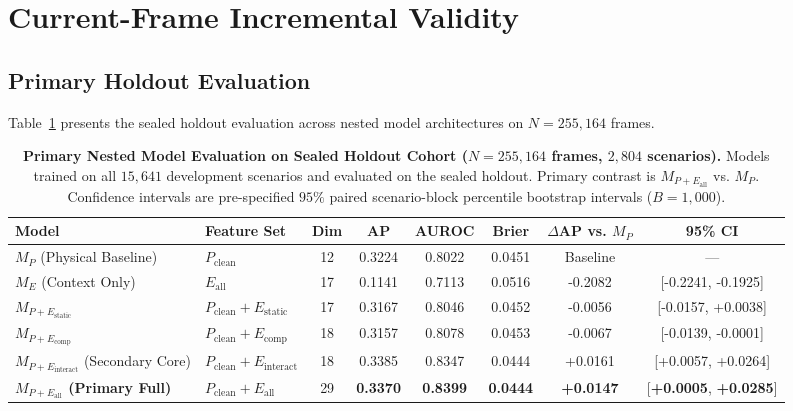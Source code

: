 \section{Current-Frame Incremental Validity}
\label{sec:primary_results}

\subsection{Primary Holdout Evaluation}
Table~\ref{tab:nested_models} presents the sealed holdout evaluation across nested model architectures on $N=255,164$ frames.

\begin{table}[t]
\centering
\footnotesize
\setlength{\tabcolsep}{4pt}
\caption{\textbf{Primary Nested Model Evaluation on Sealed Holdout Cohort ($N=255,164$ frames, $2,804$ scenarios).} Models trained on all $15,641$ development scenarios and evaluated on the sealed holdout. Primary contrast is $M_{P+E_{\text{all}}}$ vs. $M_P$. Confidence intervals are pre-specified $95\%$ paired scenario-block percentile bootstrap intervals ($B=1,000$).}
\label{tab:nested_models}
\begin{tabularx}{\textwidth}{l l c c c c c c}
\toprule
\textbf{Model} & \textbf{Feature Set} & \textbf{Dim} & \textbf{AP} & \textbf{AUROC} & \textbf{Brier} & \textbf{$\Delta$AP vs. $M_P$} & \textbf{95\% CI} \\
\midrule
$M_P$ (Physical Baseline) & $P_{\text{clean}}$ & 12 & 0.3224 & 0.8022 & 0.0451 & Baseline & --- \\
$M_E$ (Context Only) & $E_{\text{all}}$ & 17 & 0.1141 & 0.7113 & 0.0516 & -0.2082 & [-0.2241, -0.1925] \\
$M_{P+E_{\text{static}}}$ & $P_{\text{clean}} + E_{\text{static}}$ & 17 & 0.3167 & 0.8046 & 0.0452 & -0.0056 & [-0.0157, +0.0038] \\
$M_{P+E_{\text{comp}}}$ & $P_{\text{clean}} + E_{\text{comp}}$ & 18 & 0.3157 & 0.8078 & 0.0453 & -0.0067 & [-0.0139, -0.0001] \\
$M_{P+E_{\text{interact}}}$ (Secondary Core) & $P_{\text{clean}} + E_{\text{interact}}$ & 18 & 0.3385 & 0.8347 & 0.0444 & +0.0161 & [+0.0057, +0.0264] \\
\textbf{$M_{P+E_{\text{all}}}$ (Primary Full)} & $P_{\text{clean}} + E_{\text{all}}$ & 29 & \textbf{0.3370} & \textbf{0.8399} & \textbf{0.0444} & \textbf{+0.0147} & [\textbf{+0.0005}, \textbf{+0.0285}] \\
\bottomrule
\end{tabularx}
\end{table}

